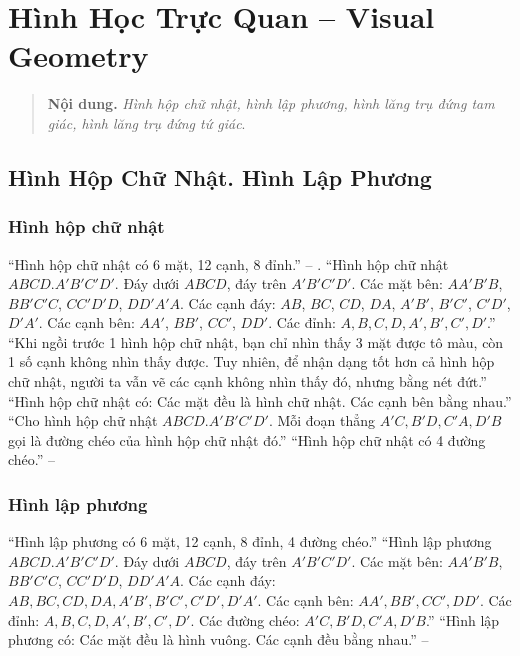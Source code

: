 \documentclass[oneside]{book}
\numberwithin{equation}{section}
\begin{document}

\chapter{Hình Học Trực Quan -- Visual Geometry}

\begin{quotation}
	\textbf{Nội dung.} \textit{Hình hộp chữ nhật, hình lập phương, hình lăng trụ đứng tam giác, hình lăng trụ đứng tứ giác}.
\end{quotation}

\section{Hình Hộp Chữ Nhật. Hình Lập Phương}

\subsection{Hình hộp chữ nhật}
``Hình hộp chữ nhật có 6 mặt, 12 cạnh, 8 đỉnh.'' -- \cite[p. 76]{SGK_Toan_7_Canh_Dieu_tap_1}. ``Hình hộp chữ nhật $ABCD.A'B'C'D'$. Đáy dưới $ABCD$, đáy trên $A'B'C'D'$. Các mặt bên: $AA'B'B$, $BB'C'C$, $CC'D'D$, $DD'A'A$. Các cạnh đáy: $AB$, $BC$, $CD$, $DA$, $A'B'$, $B'C'$, $C'D'$, $D'A'$. Các cạnh bên: $AA'$, $BB'$, $CC'$, $DD'$. Các đỉnh: $A,B,C,D,A',B',C',D'$.'' ``Khi ngồi trước 1 hình hộp chữ nhật, bạn chỉ nhìn thấy 3 mặt được tô màu, còn 1 số cạnh không nhìn thấy được. Tuy nhiên, để nhận dạng tốt hơn cả hình hộp chữ nhật, người ta vẫn vẽ các cạnh không nhìn thấy đó, nhưng bằng nét đứt.'' ``Hình hộp chữ nhật có: Các mặt đều là hình chữ nhật. Các cạnh bên bằng nhau.'' ``Cho hình hộp chữ nhật $ABCD.A'B'C'D'$. Mỗi đoạn thẳng $A'C,B'D,C'A,D'B$ gọi là đường chéo của hình hộp chữ nhật đó.'' ``Hình hộp chữ nhật có 4 đường chéo.'' -- \cite[p. 77]{SGK_Toan_7_Canh_Dieu_tap_1}

\subsection{Hình lập phương}
``Hình lập phương có 6 mặt, 12 cạnh, 8 đỉnh, 4 đường chéo.'' ``Hình lập phương $ABCD.A'B'C'D'$. Đáy dưới $ABCD$, đáy trên $A'B'C'D'$. Các mặt bên: $AA'B'B$, $BB'C'C$, $CC'D'D$, $DD'A'A$. Các cạnh đáy: $AB,BC,CD,DA,A'B',B'C',C'D',D'A'$. Các cạnh bên: $AA',BB',CC',DD'$. Các đỉnh: $A,B,C,D,A',B',C',D'$. Các đường chéo: $A'C,B'D,C'A,D'B$.'' ``Hình lập phương có: Các mặt đều là hình vuông. Các cạnh đều bằng nhau.'' -- \cite[p. 78]{SGK_Toan_7_Canh_Dieu_tap_1}
\end{document}
